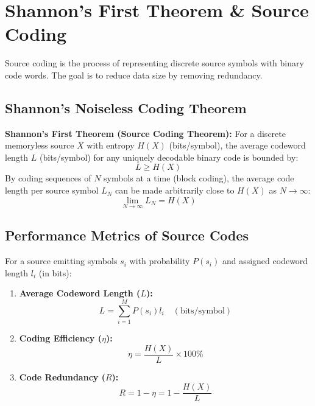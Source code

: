 \documentclass[12pt,a4paper]{article}
\begin{document}
\section{Shannon's First Theorem \& Source Coding}

Source coding is the process of representing discrete source symbols with binary code words. The goal is to reduce data size by removing redundancy.

\subsection{Shannon's Noiseless Coding Theorem}
\begin{tcolorbox}[defbox]
\textbf{Shannon's First Theorem (Source Coding Theorem):} For a discrete memoryless source $X$ with entropy $H(X)$ (bits/symbol), the average codeword length $L$ (bits/symbol) for any uniquely decodable binary code is bounded by:
\begin{equation}
  L \ge H(X)
\end{equation}
By coding sequences of $N$ symbols at a time (block coding), the average code length per source symbol $L_N$ can be made arbitrarily close to $H(X)$ as $N \to \infty$:
\begin{equation}
  \lim_{N \to \infty} L_N = H(X)
\end{equation}
\end{tcolorbox}

\subsection{Performance Metrics of Source Codes}
For a source emitting symbols $s_i$ with probability $P(s_i)$ and assigned codeword length $l_i$ (in bits):
\begin{tcolorbox}[formulabox, title={\textbf{Average Length, Efficiency, and Redundancy}}]
\begin{enumerate}[label=\textbf{\arabic*.}, leftmargin=1.5em, itemsep=4pt, topsep=2pt]
  \item \textbf{Average Codeword Length ($L$):}
    \begin{equation}
      L = \sum_{i=1}^M P(s_i) l_i \quad (\text{bits/symbol})
    \end{equation}
  \item \textbf{Coding Efficiency ($\eta$):}
    \begin{equation}
      \eta = \frac{H(X)}{L} \times 100\%
    \end{equation}
  \item \textbf{Code Redundancy ($R$):}
    \begin{equation}
      R = 1 - \eta = 1 - \frac{H(X)}{L}
    \end{equation}
\end{enumerate}
\end{tcolorbox}
\end{document}
